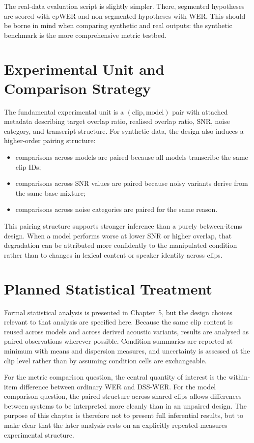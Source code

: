 The real-data evaluation script is slightly simpler. There, segmented hypotheses are scored with cpWER and non-segmented hypotheses with WER. This should be borne in mind when comparing synthetic and real outputs: the synthetic benchmark is the more comprehensive metric testbed.

\section{Experimental Unit and Comparison Strategy}
The fundamental experimental unit is a \((\text{clip}, \text{model})\) pair with attached metadata describing target overlap ratio, realised overlap ratio, SNR, noise category, and transcript structure. For synthetic data, the design also induces a higher-order pairing structure:
\begin{itemize}
    \item comparisons across models are paired because all models transcribe the same clip IDs;
    \item comparisons across SNR values are paired because noisy variants derive from the same base mixture;
    \item comparisons across noise categories are paired for the same reason.
\end{itemize}

This pairing structure supports stronger inference than a purely between-items design. When a model performs worse at lower SNR or higher overlap, that degradation can be attributed more confidently to the manipulated condition rather than to changes in lexical content or speaker identity across clips.

\section{Planned Statistical Treatment}
Formal statistical analysis is presented in Chapter~5, but the design choices relevant to that analysis are specified here. Because the same clip content is reused across models and across derived acoustic variants, results are analysed as paired observations wherever possible. Condition summaries are reported at minimum with means and dispersion measures, and uncertainty is assessed at the clip level rather than by assuming condition cells are exchangeable.

For the metric comparison question, the central quantity of interest is the within-item difference between ordinary WER and DSS-WER. For the model comparison question, the paired structure across shared clips allows differences between systems to be interpreted more cleanly than in an unpaired design. The purpose of this chapter is therefore not to present full inferential results, but to make clear that the later analysis rests on an explicitly repeated-measures experimental structure.

